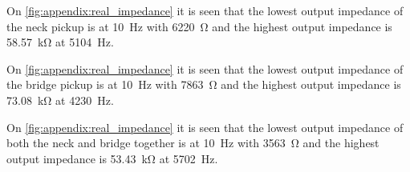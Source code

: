 On \autoref{fig:appendix:real_impedance} it is seen that the lowest output impedance of the neck pickup is at \SI{10}{\hertz} with \SI{6220}{\ohm}  and the highest output impedance is \SI{58,57}{\kilo\ohm} at \SI{5104}{\hertz}.

On  \autoref{fig:appendix:real_impedance} it is seen that the lowest output impedance of the bridge pickup is at \SI{10}{\hertz} with \SI{7863}{\ohm}  and the highest output impedance is \SI{73,08}{\kilo\ohm} at \SI{4230}{\hertz}.

On  \autoref{fig:appendix:real_impedance} it is seen that the lowest output impedance of both the neck and bridge together is at \SI{10}{\hertz} with \SI{3563}{\ohm}  and the highest output impedance is \SI{53,43}{\kilo\ohm} at \SI{5702}{\hertz}.